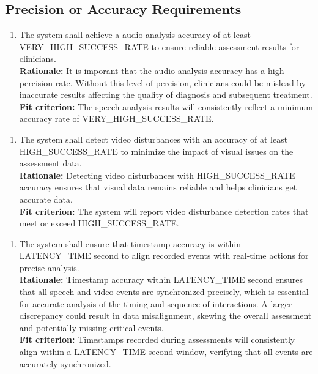 \documentclass[12pt]{article}
\begin{document}
\subsection{Precision or Accuracy Requirements}
\begin{enumerate}[label={PR-PA}1. ]
  \item The system shall achieve a audio analysis accuracy of at least\\ VERY\_HIGH\_SUCCESS\_RATE to ensure reliable assessment results for clinicians.\\
  \textbf{Rationale: }It is imporant that the audio analysis accuracy has a high percision rate. Without this level of percision, clinicians could 
  be mislead by inaccurate results affecting the quality of diagnosis and subsequent treatment.\\
  \textbf{Fit criterion: }The speech analysis results will consistently reflect a minimum accuracy rate of VERY\_HIGH\_SUCCESS\_RATE.  
\end{enumerate}
\begin{enumerate}[label={PR-PA}2. ]
  \item The system shall detect video disturbances with an accuracy of at least HIGH\_SUCCESS\_RATE to minimize the impact of visual issues on the assessment data.\\
  \textbf{Rationale: }Detecting video disturbances with HIGH\_SUCCESS\_RATE accuracy ensures that visual data remains reliable and helps clinicians get accurate data.\\
  \textbf{Fit criterion: }The system will report video disturbance detection rates that meet or exceed HIGH\_SUCCESS\_RATE.  
\end{enumerate}
\begin{enumerate}[label={PR-PA}3. ]
  \item The system shall ensure that timestamp accuracy is within LATENCY\_TIME second to align recorded events with real-time actions for precise analysis.\\
  \textbf{Rationale: }Timestamp accuracy within LATENCY\_TIME second ensures that all speech and video events are synchronized precisely, which is essential for accurate analysis of the timing and sequence of interactions. A larger discrepancy could result in data misalignment, skewing the overall assessment and potentially missing critical events.\\
  \textbf{Fit criterion: }Timestamps recorded during assessments will consistently align within a LATENCY\_TIME second window, verifying that all events are accurately synchronized.  
\end{enumerate}
\end{document}
